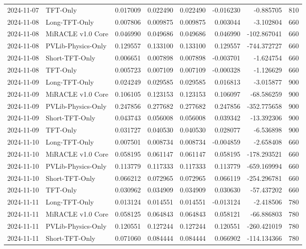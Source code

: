 \begin{tabular}{llrrrrrr}
2024-11-07 & TFT-Only & 0.017009 & 0.022490 & 0.022490 & -0.016230 & -0.885705 & 810 \\
2024-11-08 & Long-TFT-Only & 0.007806 & 0.009875 & 0.009875 & 0.003044 & -3.102804 & 660 \\
2024-11-08 & MiRACLE v1.0 Core & 0.046990 & 0.049686 & 0.049686 & 0.046990 & -102.867041 & 660 \\
2024-11-08 & PVLib-Physics-Only & 0.129557 & 0.133100 & 0.133100 & 0.129557 & -744.372727 & 660 \\
2024-11-08 & Short-TFT-Only & 0.006651 & 0.007898 & 0.007898 & -0.003701 & -1.624754 & 660 \\
2024-11-08 & TFT-Only & 0.005723 & 0.007109 & 0.007109 & -0.000328 & -1.126629 & 660 \\
2024-11-09 & Long-TFT-Only & 0.024249 & 0.029585 & 0.029585 & 0.016813 & -3.015877 & 900 \\
2024-11-09 & MiRACLE v1.0 Core & 0.106105 & 0.123153 & 0.123153 & 0.106097 & -68.586259 & 900 \\
2024-11-09 & PVLib-Physics-Only & 0.247856 & 0.277682 & 0.277682 & 0.247856 & -352.775658 & 900 \\
2024-11-09 & Short-TFT-Only & 0.043743 & 0.056008 & 0.056008 & 0.039342 & -13.392306 & 900 \\
2024-11-09 & TFT-Only & 0.031727 & 0.040530 & 0.040530 & 0.028077 & -6.536898 & 900 \\
2024-11-10 & Long-TFT-Only & 0.007501 & 0.008734 & 0.008734 & -0.004859 & -2.658408 & 660 \\
2024-11-10 & MiRACLE v1.0 Core & 0.058195 & 0.061147 & 0.061147 & 0.058195 & -178.293521 & 660 \\
2024-11-10 & PVLib-Physics-Only & 0.113779 & 0.117333 & 0.117333 & 0.113779 & -659.169994 & 660 \\
2024-11-10 & Short-TFT-Only & 0.066212 & 0.072965 & 0.072965 & 0.066119 & -254.296781 & 660 \\
2024-11-10 & TFT-Only & 0.030962 & 0.034909 & 0.034909 & 0.030630 & -57.437202 & 660 \\
2024-11-11 & Long-TFT-Only & 0.013124 & 0.014551 & 0.014551 & -0.013124 & -2.418506 & 780 \\
2024-11-11 & MiRACLE v1.0 Core & 0.058125 & 0.064843 & 0.064843 & 0.058121 & -66.886803 & 780 \\
2024-11-11 & PVLib-Physics-Only & 0.120551 & 0.127244 & 0.127244 & 0.120551 & -260.421019 & 780 \\
2024-11-11 & Short-TFT-Only & 0.071060 & 0.084444 & 0.084444 & 0.066902 & -114.134366 & 780 \\

\end{tabular}
